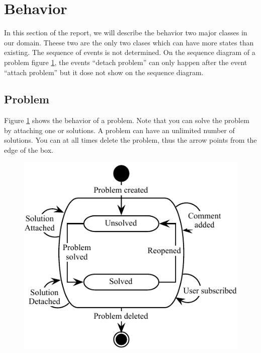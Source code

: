  \section{Behavior}
In this section of the report, we will describe the behavior two major classes in our domain. Theese two are the only two clases which can have more states than existing. 
The sequence of events is not determined. On the sequence diagram of a problem figure \ref{fig:Klasse_diagram_problem}, the events ``detach problem'' can only happen after the event ``attach problem'' but it dose not show on the sequence diagram.      


\subsection{Problem}
\label{sub:problem}
Figure \ref{fig:Klasse_diagram_problem} shows the behavior of a problem. Note that you can solve the problem by attaching one or solutions. A problem can have an unlimited number of solutions. You can at all times delete the problem, thus the arrow points from the edge of the box.
\begin{figure}[H]
\begin{center}
\includegraphics[scale=1]{input/problem_domain_analysis/Klassediagram_problem.pdf}
\label{fig:Klasse_diagram_problem}
\end{center}
\end{figure}

